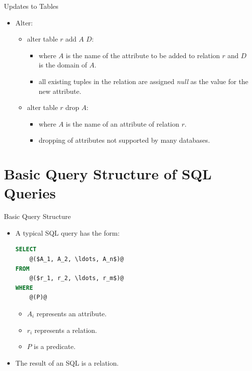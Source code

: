 \documentclass{beamer}
\begin{document}
\begin{frame}{Updates to Tables}
    \begin{itemize}
        \item Alter:
        \begin{itemize}
            \item alter table $r$ add $A$ $D$:
            \begin{itemize}
                \item where $A$ is the name of the attribute to be added to relation $r$ and $D$ is the domain of $A$.
                \item all existing tuples in the relation are assigned \textit{null} as the value for the new attribute.
            \end{itemize}
            \item alter table $r$ drop $A$:
            \begin{itemize}
                \item where $A$ is the name of an attribute of relation $r$.
                \item dropping of attributes not supported by many databases.
            \end{itemize}
        \end{itemize}
    \end{itemize}
\end{frame}

\section{Basic Query Structure of SQL Queries}

\begin{frame}[fragile]{Basic Query Structure}
    \begin{itemize}
        \item A typical SQL query has the form:
        \begin{lstlisting}[language=SQL]
SELECT
    @($A_1, A_2, \ldots, A_n$)@
FROM
    @($r_1, r_2, \ldots, r_m$)@
WHERE
    @(P)@
        \end{lstlisting}
        \begin{itemize}
            \item $A_i$ represents an attribute.
            \item $r_i$ represents a relation.
            \item $P$ is a predicate.
        \end{itemize}
        \item The result of an SQL is a relation.
    \end{itemize}
\end{frame}
\end{document}

